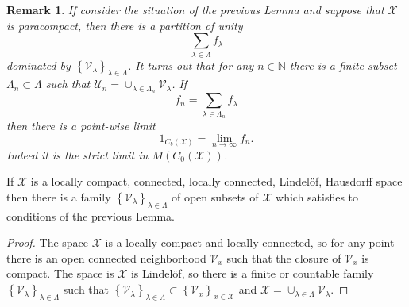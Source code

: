 \documentclass{beamer}
\theoremstyle{plain}
\newtheorem{rem}{Remark}
\newcommand{\be}{\begin{equation}}
\newcommand{\ee}{\end{equation}}
\newcommand{\sU}{\mathcal{U}}       %
\newcommand{\sV}{\mathcal{V}}       %
\newcommand{\sX}{\mathcal{X}}       %
\newcommand{\N}{\mathbb{N}}                  %
\newcommand{\la}{\lambda}
\newcommand{\La}{\Lambda}
\begin{document}
\begin{frame}
	
	\begin{rem}\label{fin_comp_lin_empt}
		If consider the situation of the previous Lemma and 	suppose that $\sX$ is paracompact, then  
		there is a partition of unity 
		$$
		\sum_{ \la\in \La}f_\la
		$$
		dominated by  $\left\{\sV_\la \right\}_{\la \in \La}$. It turns out that for any $n \in \N$ there is a finite subset $\La_n \subset \La$ such that $\sU_n = \cup_{\la \in \La_n}\sV_\la$. If 
		\be\label{fin_comp_lin_eqn}
		f_n = \sum_{ \la \in \La_n}f_\la
		\ee
		then there is a point-wise limit
		\be\label{fin_comp_lin_n_eqn}
		1_{C_b\left(\sX \right) } = \lim_{n\to \infty}f_n.
		\ee
		Indeed it is the strict limit in $M\left(C_0\left( \sX\right)  \right)$. 
	\end{rem}
\end{frame}
\begin{frame}
\begin{lemma}\label{fin_comp_linl_lem}
	If  $\sX$ is a locally compact, connected, locally connected,  Lindel\"{o}f,  Hausdorff space  then there is a family $\left\{\sV_\la \right\}_{\la \in \La}$ of open subsets of $\sX$ which satisfies to conditions of the previous Lemma.
\end{lemma}
\begin{proof}
	The space $\sX$ is a locally compact and locally connected, so for any point there is an open connected neighborhood $\sV_x$ such that the closure of $\sV_x$ is compact. The space is $\sX$ is  Lindel\"{o}f, so there is a finite or countable family $\left\{\sV_\la \right\}_{\la \in \La}$  such that $\left\{\sV_\la \right\}_{\la \in \La}\subset \left\{\sV_x \right\}_{x \in \sX}$ and $\sX = \cup_{\la \in \La} \sV_\la$.
\end{proof}
\end{frame}
\end{document}
